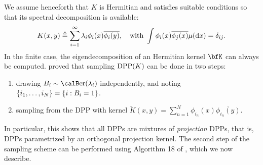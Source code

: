 \documentclass[twoside,11pt]{article}
\begin{document}
      We assume henceforth that $K$ is Hermitian and satisfies suitable conditions \cite[Theorem 3]{Sos00} so that its spectral decomposition is available:
      \begin{equation}
      \label{eq:eigdec_kernel}
        K(x,y)\triangleq\sum\limits_{i=1}^{\infty} \lambda_i \phi_i(x) \overline{\phi_i(y)},
        \quad \text{with }
        \int \phi_i(x) \overline{\phi_j(x)} \mu(\mathop{}\!\mathrm{d} x) = \delta_{ij}.
      \end{equation}
      In the finite case, the eigendecomposition of an Hermitian kernel $\bfK$ can always be computed.
      \noindent\citet[Theorem 7]{HKPV06} proved that sampling $\operatorname{DPP}(K)$ can be done in two steps:
      \begin{enumerate}
        \item drawing $B_i\sim\Ber(\lambda_i)$ independently, and noting $\left\{ i_1,\dots,i_{N} \right\} = \left\{ i:B_i=1 \right\}$.
        \item sampling from the DPP with kernel $\tilde{K}(x,y) = \sum_{n=1}^{N}\phi_{i_n}(x) \overline{\phi_{i_n}(y)}$.
      \end{enumerate}
      In particular, this shows that all DPPs are mixtures of \emph{projection} DPPs, that is, DPPs parametrized by an orthogonal projection kernel.
      The second step of the sampling scheme can be performed using Algorithm 18 of \cite{HKPV06}, which we now describe.
\end{document}
